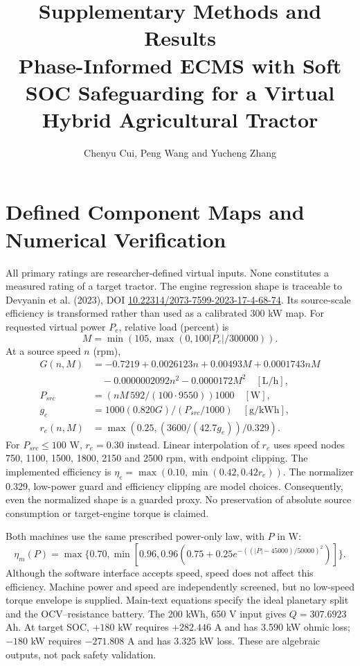 \documentclass[11pt,a4paper]{article}
\title{Supplementary Methods and Results\\\large Phase-Informed ECMS with Soft SOC Safeguarding for a Virtual Hybrid Agricultural Tractor}
\author{Chenyu Cui, Peng Wang and Yucheng Zhang}\date{}
\begin{document}
\maketitle
\renewcommand{\thesection}{S\arabic{section}}
\section{Defined Component Maps and Numerical Verification}
All primary ratings are researcher-defined virtual inputs. None constitutes a measured rating of a target tractor. The engine regression shape is traceable to Devyanin et al. (2023), DOI \href{https://doi.org/10.22314/2073-7599-2023-17-4-68-74}{10.22314/2073-7599-2023-17-4-68-74}. Its source-scale efficiency is transformed rather than used as a calibrated 300 kW map. For requested virtual power $P_e$, relative load (percent) is
\[
M=\min(105,\max(0,100|P_e|/300000)).
\]
At a source speed $n$ (rpm),
\begin{align*}
G(n,M)&=-0.7219+0.0026123n+0.00493M+0.0001743nM\\
&\quad-0.0000002092n^2-0.0000172M^2\quad[\mathrm{L/h}],\\
P_{src}&=(nM\,592/(100\cdot9550))1000\quad[\mathrm{W}],\\
g_e&=1000(0.820G)/(P_{src}/1000)\quad[\mathrm{g/kWh}],\\
r_e(n,M)&=\max(0.25,(3600/(42.7g_e))/0.329).
\end{align*}
For $P_{src}\leq100$ W, $r_e=0.30$ instead. Linear interpolation of $r_e$ uses speed nodes 750, 1100, 1500, 1800, 2150 and 2500 rpm, with endpoint clipping. The implemented efficiency is $\eta_e=\max(0.10,\min(0.42,0.42r_e))$. The normalizer 0.329, low-power guard and efficiency clipping are model choices. Consequently, even the normalized shape is a guarded proxy. No preservation of absolute source consumption or target-engine torque is claimed.

Both machines use the same prescribed power-only law, with $P$ in W:
\[
\eta_m(P)=\max\{0.70,\min[0.96,0.96(0.75+0.25e^{-((|P|-45000)/50000)^2})]\}.
\]
Although the software interface accepts speed, speed does not affect this efficiency. Machine power and speed are independently screened, but no low-speed torque envelope is supplied. Main-text equations specify the ideal planetary split and the OCV--resistance battery. The 200 kWh, 650 V input gives $Q=307.6923$ Ah. At target SOC, $+180$ kW requires $+282.446$ A and has 3.590 kW ohmic loss; $-180$ kW requires $-271.808$ A and has 3.325 kW loss. These are algebraic outputs, not pack safety validation.
\end{document}
